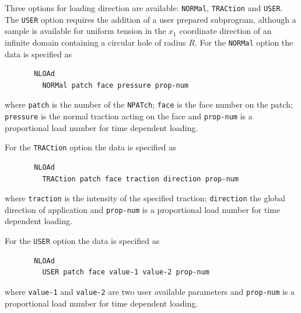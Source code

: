 Three options for loading direction are available: \texttt{NORMal},
\texttt{TRACtion} and \texttt{USER}.  The \texttt{USER} option requires
the addition of a user prepared subprogram, although a sample is available
for uniform tension in the $x_1$ coordinate direction of an infinite domain
containing a circular hole of radius $R$.
For the \texttt{NORMal} option the data is specified as
\begin{verbatim}
       NLOAd
         NORMal patch face pressure prop-num
\end{verbatim}
where \texttt{patch} is the number of the \texttt{NPATch}; \texttt{face} is the
face number on the patch; \texttt{pressure} is the normal traction acting
on the face and \texttt{prop-num} is a proportional load number for time
dependent loading.

For the \texttt{TRACtion} option the data is specified as
\begin{verbatim}
       NLOAd
         TRACtion patch face traction direction prop-num
\end{verbatim}
where \texttt{traction} is the intensity of the specified traction;
\texttt{direction} the global direction of application and \texttt{prop-num}
is a proportional load number for time dependent loading.

For the \texttt{USER} option the data is specified as
\begin{verbatim}
       NLOAd
         USER patch face value-1 value-2 prop-num
\end{verbatim}
where \texttt{value-1} and \texttt{value-2} are two user available parameters
and \texttt{prop-num} is a proportional load number for time dependent loading.
